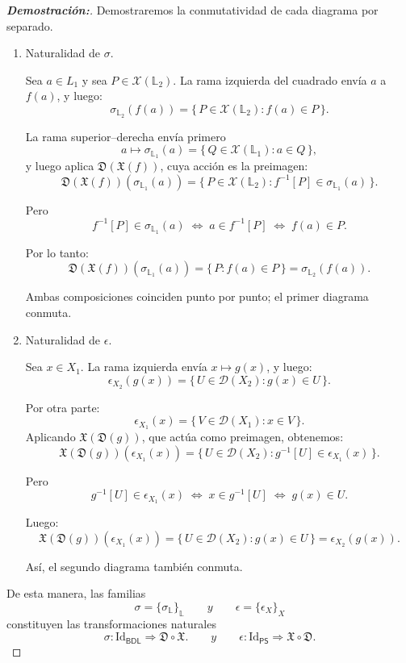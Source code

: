 \documentclass[12pt]{book}
\newcommand{\X}{\mathfrak{X}}
\newcommand{\D}{\mathfrak{D}}
\begin{document}
\begin{proof}[{\textbf{Demostración:}}]
Demostraremos la conmutatividad de cada diagrama por separado.

\begin{enumerate}
    \item Naturalidad de \(\sigma\).
    
Sea \( a\in L_{1} \) y sea \( P\in\mathcal{X}(\mathbb{L}_{2}) \).
La rama izquierda del cuadrado envía \( a \) a \( f(a) \), y luego:
\[
\sigma_{\mathbb{L}_{2}}(f(a))
=\{\,P\in\mathcal{X}(\mathbb{L}_{2}) : f(a)\in P\,\}.
\]

La rama superior–derecha envía primero
\[
a\mapsto \sigma_{\mathbb{L}_{1}}(a)=\{\,Q\in\mathcal{X}(\mathbb{L}_{1}) : a\in Q\,\},
\]
y luego aplica \( \D(\X(f)) \), cuya acción es la preimagen:
\[
\D(\X(f))(\sigma_{\mathbb{L}_{1}}(a))
= \{\,P\in\mathcal{X}(\mathbb{L}_{2}) : f^{-1}[P]\in\sigma_{\mathbb{L}_{1}}(a)\,\}.
\]

Pero
\[
f^{-1}[P]\in\sigma_{\mathbb{L}_{1}}(a)
\;\Longleftrightarrow\;
a\in f^{-1}[P]
\;\Longleftrightarrow\;
f(a)\in P.
\]

Por lo tanto:
\[
\D(\X(f))(\sigma_{\mathbb{L}_{1}}(a))
= \{\,P : f(a)\in P \,\}
= \sigma_{\mathbb{L}_{2}}(f(a)).
\]

Ambas composiciones coinciden punto por punto; el primer diagrama conmuta.

\medskip
\item Naturalidad de \(\epsilon\).

Sea \( x\in X_{1} \).  
La rama izquierda envía \( x\mapsto g(x) \), y luego:
\[
\epsilon_{X_{2}}(g(x))
= \{\,U\in \mathcal{D}(X_{2}) : g(x)\in U\,\}.
\]

Por otra parte:
\[
\epsilon_{X_{1}}(x)=\{\,V\in \mathcal{D}(X_{1}) : x\in V\,\}.
\]
Aplicando \( \X(\D(g)) \), que actúa como preimagen, obtenemos:
\[
\X(\D(g))(\epsilon_{X_{1}}(x))
= \{\,U\in \mathcal{D}(X_{2}) : g^{-1}[U]\in\epsilon_{X_{1}}(x)\,\}.
\]

Pero
\[
g^{-1}[U]\in\epsilon_{X_{1}}(x)
\;\Longleftrightarrow\;
x\in g^{-1}[U]
\;\Longleftrightarrow\;
g(x)\in U.
\]

Luego:
\[
\X(\D(g))(\epsilon_{X_{1}}(x))
= \{\,U\in \mathcal{D}(X_{2}) : g(x)\in U\,\}
= \epsilon_{X_{2}}(g(x)).
\]

Así, el segundo diagrama también conmuta.
\end{enumerate}
De esta manera, las  familias
\[
\sigma=\{\sigma_{\mathbb{L}}\}_{\mathbb{L}}\qquad y \qquad \epsilon=\{\epsilon_{X}\}_{X}
\]
constituyen las transformaciones naturales
\[
\sigma\colon \mathrm{Id}_{\mathsf{BDL}} \Rightarrow \D\circ\X. \qquad y \qquad \epsilon\colon \mathrm{Id}_{\mathsf{PS}} \Rightarrow \X\circ\D.
\]
\end{proof}
\end{document}
